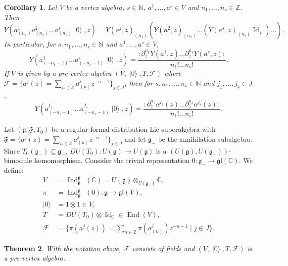 \documentclass[a4paper, 12pt, reqno]{amsart}
\newtheorem{theorem}{Theorem}[section]
\newtheorem{corollary}[theorem]{Corollary}
\theoremstyle{remark}
\numberwithin{equation}{subsection}
\DeclareMathOperator{\Id}{Id}
\DeclareMathOperator{\End}{End}
\DeclareMathOperator{\Ind}{Ind}
\DeclareMathOperator{\vac}{|0\rangle}
\begin{document}
\begin{corollary}
  \label{crl:1}
  Let $V$ be a vertex algebra, $s \in \mathbb{N}$, $a^1, \dots, a^s \in V$ and $n_1, \dots, n_s \in \mathbb{Z}$.
  Then 
  \begin{equation*}
    Y(a^1_{(n_1)}a^2_{(n_2)}\dots a^s_{(n_s)}\vac, z) = Y(a^j, z)_{(n_1)}(Y(a^2, z)_{(n_2)}\dots (Y(a^s, z)_{(n_s)}\Id_V)\dots).
  \end{equation*}
  In particular, for $s, n_1, \dots, n_s \in \mathbb{N}$ and $a^1, \dots, a^s \in V$,
  \begin{equation*}
    Y(a^1_{(-n_1 - 1)}\dots a^s_{(-n_s - 1)}\vac, z) = \frac{:\partial^{n_1}_zY(a^1,z)\dots \partial^{n_s}_zY(a^s,z):}{n_1!\dots n_s!}.
  \end{equation*}
  If $V$ is given by a pre-vertex algebra $(V, \vac, T, \mathcal{F})$ where $\mathcal{F} = \{a^j(z) = \sum_{n \in \mathbb{Z}}a^j_{(n)}z^{-n - 1}\}_{j \in J}$, then for $s, n_1, \dots, n_s \in \mathbb{N}$ and $j_1, \dots, j_s \in J$,
  \begin{equation*}
    Y(a^{j_1}_{(-n_1 - 1)}\dots a^{j_s}_{(-n_s - 1)}\vac, z) = \frac{:\partial^{n_1}_za^{j_1}(z)\dots \partial^{n_s}_za^{j_s}(z):}{n_1!\dots n_s!}.
  \end{equation*}
\end{corollary}

Let $(\mathfrak{g}, \mathfrak{F}, T_0)$ be a regular formal distribution Lie superalgebra with $\mathfrak{F} = \{a^j(z) = \sum_{n \in \mathbb{Z}}a^j_{(n)}z^{-n - 1}\}_{j \in J}$ and let $\mathfrak{g}_-$ be the annihilation subalgebra.
Since $T_0(\mathfrak{g}_-) \subseteq \mathfrak{g}_-$, $DU(T_0): U(\mathfrak{g}) \to U(\mathfrak{g})$ is a $(U(\mathfrak{g}), U(\mathfrak{g}_-))$-bimodule homomorphism.
Consider the trivial representation $0: \mathfrak{g}_- \to \mathfrak{gl}(\mathbb{C})$.
We define:
\begin{align*}
  V &= \Ind^{\mathfrak{g}}_{\mathfrak{g}_-}(\mathbb{C}) = U(\mathfrak{g}) \otimes_{U(\mathfrak{g}_-)} \mathbb{C}, \\
  \pi &= \Ind^{\mathfrak{g}}_{\mathfrak{g}_-}(0): \mathfrak{g} \to \mathfrak{gl}(V), \\
  \vac &= 1\otimes1 \in V, \\
  T &= DU(T_0) \otimes \Id_{\mathbb{C}} \in \End(V), \\
  \mathcal{F} &= \{\pi(a^j(z)) = \sum_{n \in \mathbb{Z}}\pi(a^j_{(n)})z^{-n - 1} \mid j \in J\}.
\end{align*}

\begin{theorem}
  \label{thr:21}
  With the notation above, $\mathcal{F}$ consists of fields and $(V, \vac, T, \mathcal{F})$ is a pre-vertex algebra.
\end{theorem}
\end{document}
